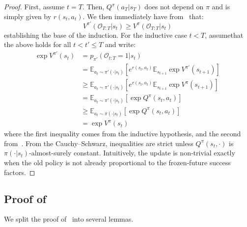 \begin{proof}
    First, assume $t=T$. Then, $Q^\pi(a_T|s_T)$ does not depend on $\pi$ and is simply given by $r(s_t, a_t)$. We then immediately have from~ that:
    \[
    V^{\pi'}(\mathcal{O}_{T:T}|s_t) \geq V^{\pi}(\mathcal{O}_{T:T}|s_t)
    \]
    establishing the base of the induction. For the inductive case $t < T$, assumethat the above holds for all $t < t' \leq T$ and write:
    \begin{align*}
      \exp V^{\pi'}(s_t) &= p_{\pi'}(\mathcal{O}_{t:T}=1 | s_t)\\
      &= \mathbb{E}_{a_t\sim \pi'(\cdot| s_t)}\left[e^{r(s_t,a_t)}
      \mathbb{E}_{s_{t+1}} \exp V^{\pi'}(s_{t+1})\right] \\
      &\geq \mathbb{E}_{a_t\sim \pi'(\cdot| s_t)}\left[e^{r(s_t,a_t)}
      \mathbb{E}_{s_{t+1}} \exp V^{\pi}(s_{t+1})\right] \\
      &= \mathbb{E}_{a_t\sim \pi'(\cdot| s_t)}\left[\exp Q^\pi(s_t, a_t)\right] \\
      &\geq \mathbb{E}_{a_t\sim \pi(\cdot| s_t)}\left[\exp Q^\pi(s_t, a_t)\right] \\
      &= \exp V^\pi(s_t)
    \end{align*}
    where the first inequality comes from the inductive hypothesis, and the second from~.
    From the Cauchy–Schwarz, inequalities are strict unless $Q^\pi(s_t,\cdot)$ is $\pi(\cdot| s_t)$-almost-surely constant. Intuitively, the update is non‑trivial exactly when the old policy is not already proportional to the frozen‑future success factors.
\end{proof}

\subsection{Proof of~}

We split the proof of~ into several lemmas.

